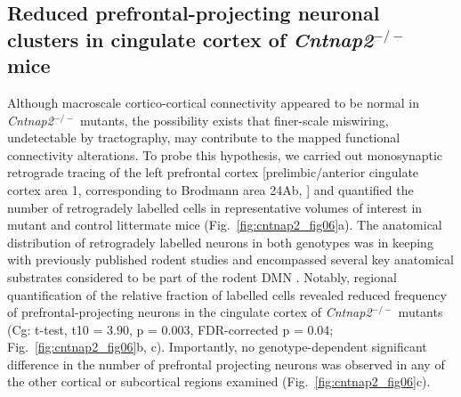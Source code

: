 \subsection{Reduced prefrontal-projecting neuronal clusters in cingulate cortex
of \textit{Cntnap2}$^{-/-}$ mice}

Although macroscale cortico-cortical connectivity appeared to be normal in
\textit{Cntnap2}$^{-/-}$ mutants, the possibility exists that finer-scale miswiring,
undetectable by tractography, may contribute to the mapped functional
connectivity alterations. To probe this hypothesis, we carried out monosynaptic
retrograde tracing of the left prefrontal cortex [prelimbic/anterior cingulate
cortex area 1, corresponding to Brodmann area 24Ab, \parencite{vogt2014}] and
quantified the number of retrogradely labelled cells in representative volumes
of interest in mutant and control littermate mice
(Fig.~\ref{fig:cntnap2_fig06}a). The anatomical distribution of retrogradely
labelled neurons in both genotypes was in keeping with previously published
rodent studies \parencite{hoover2007} and encompassed several key anatomical
substrates considered to be part of the rodent DMN \parencite{gozzi2016}.
Notably, regional quantification of the relative fraction of labelled cells
revealed reduced frequency of prefrontal-projecting neurons in the cingulate
cortex of \textit{Cntnap2}$^{-/-}$ mutants (Cg: t-test, t10 = 3.90, p = 0.003, FDR-corrected p
= 0.04; Fig.~\ref{fig:cntnap2_fig06}b, c). Importantly, no genotype-dependent
significant difference in the number of prefrontal projecting neurons was
observed in any of the other cortical or subcortical regions examined
(Fig.~\ref{fig:cntnap2_fig06}c).

